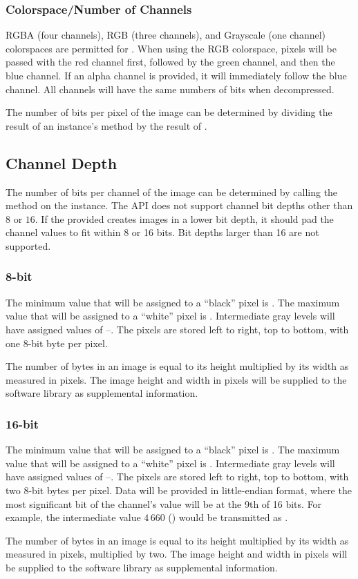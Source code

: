 \subsubsection{Colorspace/Number of Channels}
RGBA (four channels), RGB (three channels), and Grayscale (one channel)
colorspaces are permitted for \libs. When using the RGB colorspace, pixels will
be passed with the red channel first, followed by the green channel, and then
the blue channel.  If an alpha channel is provided, it will immediately follow
the blue channel. All channels will have the same numbers of bits when
decompressed.

The number of bits per pixel of the image can be determined by dividing the
result of an  instance's  method by the result of
.

\subsection{Channel Depth}
The number of bits per channel of the image can be determined by calling the
 method on the  instance. The API does not
support channel bit depths other than $8$ or $16$. If the provided \scanner
creates images in a lower bit depth, it should pad the channel values to fit
within 8 or 16 bits. Bit depths larger than 16 are not supported.

\subsubsection{8-bit}
The minimum value that will be assigned to a ``black'' pixel is . The
maximum value that will be assigned to a ``white'' pixel is .
Intermediate gray levels will have assigned values of --.
The pixels are stored left to right, top to bottom, with one 8-bit byte per
pixel.

The number of bytes in an image is equal to its height multiplied by its width
as measured in pixels. The image height and width in pixels will be supplied to
the software library as supplemental information.

\subsubsection{16-bit}
The minimum value that will be assigned to a ``black'' pixel is .
The maximum value that will be assigned to a ``white'' pixel is .
Intermediate gray levels will have assigned values of --. The pixels are stored left to right, top to bottom, with two 8-bit bytes
per pixel. Data will be provided in little-endian format, where the most
significant bit of the channel's value will be at the 9th of 16 bits. For
example, the intermediate value $4\,660$ () would be transmitted
as .

The number of bytes in an image is equal to its height multiplied by its width
as measured in pixels, multiplied by two. The image height and width in pixels
will be supplied to the software library as supplemental information.

